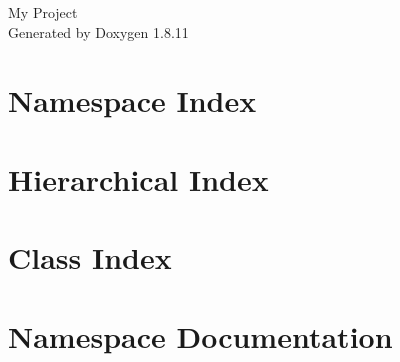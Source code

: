 \documentclass[twoside]{book}
\newcommand{\+}{\discretionary{\mbox{\scriptsize$\hookleftarrow$}}{}{}}
\newcommand{\clearemptydoublepage}{%
  \newpage{\pagestyle{empty}\cleardoublepage}%
}
\begin{document}
\hypersetup{pageanchor=false,
             bookmarksnumbered=true,
             pdfencoding=unicode
            }
\begin{titlepage}
\vspace*{7cm}
\begin{center}%
{\Large My Project }\\
\vspace*{1cm}
{\large Generated by Doxygen 1.8.11}\\
\end{center}
\end{titlepage}
\clearemptydoublepage
\tableofcontents
\clearemptydoublepage
{}
\hypersetup{pageanchor=true}

\chapter{Namespace Index}

\chapter{Hierarchical Index}

\chapter{Class Index}

\chapter{Namespace Documentation}









\end{document}
